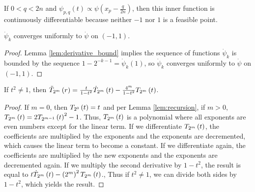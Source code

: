 If $0 < q < 2n$ and $\psi_{p,q}\left(t\right) \propto \psi\left(x_p - \frac{q}{2n}\right)$, then this inner function is continuously differentiable because neither $-1$ nor $1$ is a feasible point.

\begin{lemma}[]
  \label{lem:derivative_convergence}
  \leanok
  $\dot{\psi}_k$ converges uniformly to $\dot{\psi}$ on $\left(-1,1\right)$.
\end{lemma}
\begin{proof}
  Lemma \ref{lem:derivative_bound} implies the sequence of functions $\dot{\psi}_k$ is bounded by the sequence $1 - 2^{-k - 1} = \dot{\psi}_k\left(1\right)$, so $\dot{\psi}_k$ converges uniformly to $\dot{\psi}$ on $\left(-1,1\right)$.
\end{proof}

\begin{lemma}
  \label{lem:ODE}
  \leanok
  If $t^2 \neq 1$, then $\ddot{T}_{2^m}\left(r\right) = \frac{t}{1 - t^2} \dot{T}_{2^m}\left(t\right) - \frac{4^m}{1 - t^2} T_{2^{m}}\left(t\right)$.
\end{lemma}
\begin{proof}
  \leanok
  If $m = 0$, then $T_{2^{0}}\left(t\right) = t$ and per Lemma \ref{lem:recursion}, if $m > 0$, $T_{2^{m}}\left(t\right) = 2T_{2^{m - 1}}\left(t\right)^2 - 1$. Thus, $T_{2^{m}}\left(t\right)$ is a polynomial where all exponents are even numbers except for the linear term. If we differentiate $T_{2^{m}}\left(t\right)$, the coefficients are multiplied by the exponents and the exponents are decremented, which causes the linear term to become a constant. If we differentiate again, the coefficients are multiplied by the new exponents and the exponents are decremented again. If we multiply the second derivative by $1 - t^2$, the result is equal to $t \dot{T}_{2^m}\left(t\right) - \left(2^m\right)^2 T_{2^{m}}\left(t\right)$., Thus if $t^2 \neq 1$, we can divide both sides by $1 - t^2$, which yields the result.
\end{proof}

